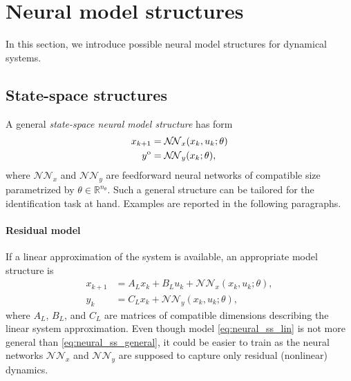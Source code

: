 \documentclass{article}
\newcommand{\NN}{\mathcal{N\!N}} %
\newcommand{\ntheta}{n_\theta}
\newcommand{\ymodel}{y^{\rm o}}
\begin{document}
\section{Neural model structures}
\label{sec:model_structure}
In this section, we introduce possible neural model structures for dynamical systems. 

\subsection{State-space structures}
\label{sec:ss_model_structure}
A general \emph{state-space neural  model structure} has form 
\begin{subequations}
\label{eq:neural_ss_general}
\begin{align}
 x_{k+1} &= \NN_x(x_{k}, u_{k}; \theta) \\
 \ymodel &= \NN_y(x_k; \theta),
\end{align}
\end{subequations}
where $\NN_x$ and $\NN_y$ are feedforward neural networks of compatible size parametrized by $\theta \in \mathbb{R}^{\ntheta}$.  Such a general structure can be tailored for the identification task at hand. Examples are reported in the following paragraphs.

\paragraph{Residual model}
If a linear approximation of the system is available, an appropriate model structure is
\begin{subequations}
\label{eq:neural_ss_lin}
\begin{align}
 x_{k+1} &= A_L x_k + B_L u_k + \NN_x(x_{k}, u_{k}; \theta),  \label{eq:neural_ss_lin_state}\\
 y_k     &= C_L x_k + \NN_y(x_{k}, u_{k}; \theta),
\end{align}
\end{subequations}
where $A_L$, $B_L$, and $C_L$ are matrices of compatible dimensions describing the linear system approximation. Even though model \eqref{eq:neural_ss_lin} is not more general than \eqref{eq:neural_ss_general}, it could be easier to train  as the neural networks $\NN_x$ and $\NN_y$ are supposed to capture only residual (nonlinear) dynamics.    
\end{document}
